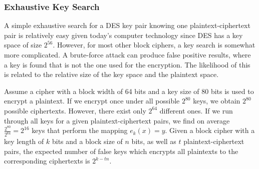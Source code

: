 \documentclass{math}
\begin{document}
\subsubsection*{Exhaustive Key Search}
A simple exhaustive search for a DES key pair knowing one plaintext-ciphertext
pair is relatively easy given today's computer technology since DES has a key
space of size \( 2^{56} \). However, for most other block ciphers, a key search
is somewhat more complicated. A brute-force attack can produce false positive
results, where a key is found that is not the one used for the encryption. The
likelihood of this is related to the relative size of the key space and the
plaintext space. \par
Assume a cipher with a block width of 64 bits and a key size of 80 bits is used
to encrypt a plaintext. If we encrypt once under all possible \( 2^{80} \) keys,
we obtain \( 2^{80} \) possible ciphertexts. However, there exist only
\( 2^{64} \) different ones. If we run through all keys for a given
plaintext-ciphertext pairs, we find on average \( \frac{2^{80}}{2^{64}} =
2^{16} \) keys that perform the mapping \( e_k(x) = y \). Given a block cipher
with a key length of \( k \) bits and a block size of \( n \) bits, as well as
\( t \) plaintext-ciphertext pairs, the expected number of false keys which
encrypts all plaintexts to the corresponding ciphertexts is \( 2^{k-tn} \).
\end{document}
